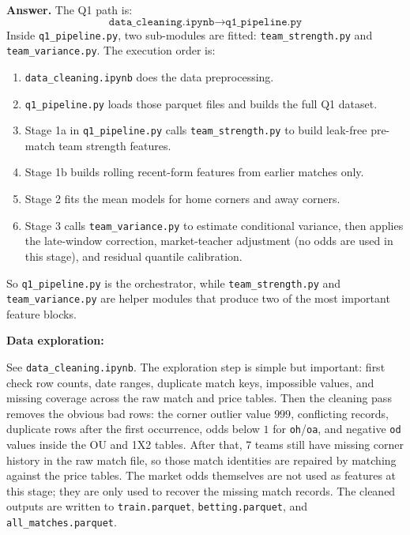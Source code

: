 \documentclass{article}
\begin{document}
\noindent \textbf{Answer.} The Q1 path is:
\[
\texttt{data\_cleaning.ipynb}
\rightarrow
\texttt{q1\_pipeline.py}
\]
Inside \texttt{q1\_pipeline.py}, two sub-modules are fitted: \texttt{team\_strength.py} and \texttt{team\_variance.py}. The execution order is:
\begin{enumerate}
    \item \texttt{data\_cleaning.ipynb} does the data preprocessing.
    \item \texttt{q1\_pipeline.py} loads those parquet files and builds the full Q1 dataset.
    \item Stage 1a in \texttt{q1\_pipeline.py} calls \texttt{team\_strength.py} to build leak-free pre-match team strength features.
    \item Stage 1b builds rolling recent-form features from earlier matches only.
    \item Stage 2 fits the mean models for home corners and away corners.
    \item Stage 3 calls \texttt{team\_variance.py} to estimate conditional variance, then applies the late-window correction, market-teacher adjustment (no odds are used in this stage), and residual quantile calibration.
\end{enumerate}
So \texttt{q1\_pipeline.py} is the orchestrator, while \texttt{team\_strength.py} and \texttt{team\_variance.py} are helper modules that produce two of the most important feature blocks.

\bigskip

\noindent \textbf{Data exploration:}

\noindent See \texttt{data\_cleaning.ipynb}. The exploration step is simple but important: first check row counts, date ranges, duplicate match keys, impossible values, and missing coverage across the raw match and price tables. Then the cleaning pass removes the obvious bad rows: the corner outlier value \(999\), conflicting records, duplicate rows after the first occurrence, odds below \(1\) for \texttt{oh}/\texttt{oa}, and negative \texttt{od} values inside the OU and 1X2 tables. After that, 7 teams still have missing corner history in the raw match file, so those match identities are repaired by matching against the price tables. The market odds themselves are not used as features at this stage; they are only used to recover the missing match records. The cleaned outputs are written to \texttt{train.parquet}, \texttt{betting.parquet}, and \texttt{all\_matches.parquet}.\\
\end{document}
